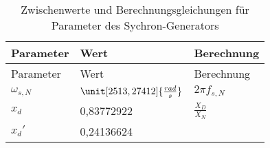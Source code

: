 \begin{longtable}[]{@{}lll@{}}
\caption{Zwischenwerte und Berechnungsgleichungen für Parameter des
Sychron-Generators}\tabularnewline
\toprule
\begin{minipage}[b]{0.10\columnwidth}\raggedright
Parameter\strut
\end{minipage} & \begin{minipage}[b]{0.25\columnwidth}\raggedright
Wert\strut
\end{minipage} & \begin{minipage}[b]{0.55\columnwidth}\raggedright
Berechnung\strut
\end{minipage}\tabularnewline
\midrule
\endfirsthead
\toprule
\begin{minipage}[b]{0.10\columnwidth}\raggedright
Parameter\strut
\end{minipage} & \begin{minipage}[b]{0.25\columnwidth}\raggedright
Wert\strut
\end{minipage} & \begin{minipage}[b]{0.55\columnwidth}\raggedright
Berechnung\strut
\end{minipage}\tabularnewline
\midrule
\endhead
\begin{minipage}[t]{0.10\columnwidth}\raggedright
\(\omega_{s,N}\)\strut
\end{minipage} & \begin{minipage}[t]{0.25\columnwidth}\raggedright
\(\unit[2513,27412]{\frac{rad}{s}}\)\strut
\end{minipage} & \begin{minipage}[t]{0.55\columnwidth}\raggedright
\(2\pi f_{s,N}\)\strut
\end{minipage}\tabularnewline
\begin{minipage}[t]{0.10\columnwidth}\raggedright
\(x_d\)\strut
\end{minipage} & \begin{minipage}[t]{0.25\columnwidth}\raggedright
0,83772922\strut
\end{minipage} & \begin{minipage}[t]{0.55\columnwidth}\raggedright
\(\frac{X_D}{X_N}\)\strut
\end{minipage}\tabularnewline
\begin{minipage}[t]{0.10\columnwidth}\raggedright
\(x_d'\)\strut
\end{minipage} & \begin{minipage}[t]{0.25\columnwidth}\raggedright
0,24136624\strut
\end{minipage} & \begin{minipage}[t]{0.55\columnwidth}\raggedright

\end{minipage}
\end{longtable}
